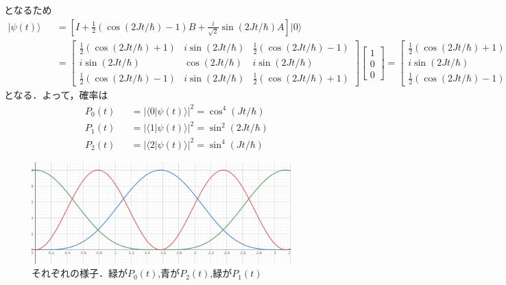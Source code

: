 \documentclass[12pt,dvipdfmx]{jsarticle}
\begin{document}
となるため
\begin{eqnarray}
  |\psi(t)\rangle &&= \left[  I + \frac{1}{2}\left( \cos(2J t/\hbar)-1 \right)B + \frac{i}{\sqrt{2}}\sin(2J t/\hbar)A \right]|0\rangle\\
  &&=
  \begin{bmatrix}
    \frac{1}{2}(\cos(2Jt/\hbar)+1) & i \sin(2Jt/\hbar) & \frac{1}{2}(\cos(2Jt/\hbar)-1)\\
    i \sin(2Jt/\hbar) & \cos(2Jt/\hbar) & i \sin(2Jt/\hbar)\\
    \frac{1}{2}(\cos(2Jt/\hbar)-1) & i \sin(2Jt/\hbar) & \frac{1}{2}(\cos(2Jt/\hbar)+1)
  \end{bmatrix}
  \begin{bmatrix}
    1\\
    0\\
    0
  \end{bmatrix}
  =
  \begin{bmatrix}
    \frac{1}{2}(\cos(2Jt/\hbar)+1) \\
    i \sin(2Jt/\hbar)\\
    \frac{1}{2}(\cos(2Jt/\hbar)-1) 
  \end{bmatrix}
\end{eqnarray}
となる．よって，確率は
\begin{eqnarray}
  P_0(t) &&= |\langle 0|\psi(t)\rangle|^2 = \cos^4(Jt/\hbar)\\
  P_1(t) &&= |\langle 1|\psi(t)\rangle|^2 = \sin^2(2Jt/\hbar)\\
  P_2(t) &&= |\langle 2|\psi(t)\rangle|^2 = \sin^4(Jt/\hbar)
\end{eqnarray}

\begin{figure}[H]
  \begin{center}
  \includegraphics[width=100mm]{image.png}
  \caption{それぞれの様子．緑が$P_0(t)$,青が$P_2(t)$,緑が$P_1(t)$}
  \end{center}
\end{figure}
  
\end{document}
